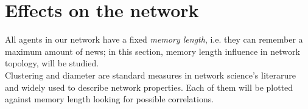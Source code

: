 \section{Effects on the network}
All agents in our network have a fixed \textit{memory length}, i.e.
they can remember a maximum amount of news;
in this section, memory length influence in network topology,
will be studied.\\
Clustering and diameter are standard measures in network science's
literarure and widely used to describe network properties.
Each of them will be plotted against memory length looking for
possible correlations.


